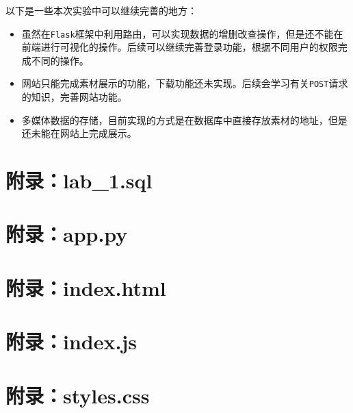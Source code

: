 \documentclass[11pt]{article}
\begin{document}
  以下是一些本次实验中可以继续完善的地方：

  \begin{itemize}
    \item 虽然在\verb|Flask|框架中利用路由，可以实现数据的增删改查操作，但是还不能在前端进行可视化的操作。后续可以继续完善登录功能，根据不同用户的权限完成不同的操作。
    \item 网站只能完成素材展示的功能，下载功能还未实现。后续会学习有关\verb|POST|请求的知识，完善网站功能。
    \item 多媒体数据的存储，目前实现的方式是在数据库中直接存放素材的地址，但是还未能在网站上完成展示。
  \end{itemize}
  
  \appendix
  \lstset{
	  numbers=left,
  }
 \pagebreak
  \section{附录：lab\_1.sql}
  \label{apd:labsql}
  

  \pagebreak
  \section{附录：app.py}
  \label{apd:apppy}
  

  \pagebreak
  \section{附录：index.html}
  \label{apd:indexhtml}
  

  \pagebreak
  \section{附录：index.js}
  \label{apd:indexjs}
  

  \pagebreak
  \section{附录：styles.css}
  \label{apd:stylescss}
  
\end{document}
